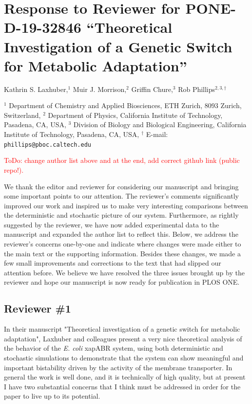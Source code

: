 \documentclass[11pt,letterpaper]{article}
\begin{document}
\section*{Response to Reviewer for PONE-D-19-32846 ``Theoretical Investigation of a Genetic Switch for Metabolic Adaptation''}
Kathrin S. Laxhuber,$^{1}$ Muir J. Morrison,$^{2}$ Griffin Chure,$^{3}$ Rob Phillips$^{2, 3, \dagger}$
\vspace{10pt}

\noindent\tiny{$^1$ Department of Chemistry and Applied Biosciences, ETH Zurich, 8093 Zurich, Switzerland,
$^2$ Department of Physics, California Institute of Technology, Pasadena, CA, USA,
$^3$ Division of Biology and Biological Engineering, California Institute of Technology, Pasadena, CA, USA, $^\dagger$ E-mail: \texttt{phillips@pboc.caltech.edu}}

{\Large\textcolor{red}{ToDo: change author list above and at the end, add correct github link (public repo!).}}

\begin{responseSummary}
We thank the editor and reviewer for considering our manuscript and
bringing some important points to our attention. The reviewer's comments
significantly improved our work and inspired us to make very interesting
comparisons between the deterministic and stochastic picture of our
system. Furthermore, as rightly suggested by the reviewer, we have now
added experimental data to the manuscript and expanded the author list
to reflect this. Below, we address the reviewer's concerns one-by-one
and indicate where changes were made either to the main text or the
supporting information. Besides these changes, we made a few small
improvements and corrections to the text that had slipped our attention before. We
believe we have resolved the three issues brought up by the reviewer and
hope our manuscript is now ready for publication in PLOS ONE.
\end{responseSummary}

\subsection*{Reviewer \#1}
\begin{review}
In their manuscript "Theoretical investigation of a genetic switch for
metabolic adaptation", Laxhuber and colleagues present a very nice
theoretical analysis of the behavior of the \emph{E. coli} xapABR system, using
both deterministic and stochastic simulations to demonstrate that the
system can show meaningful and important bistability driven by the
activity of the membrane transporter. In general the work is well done,
and it is technically of high quality, but at present I have two
substantial concerns that I think must be addressed in order for the
paper to live up to its potential.
\end{review}
\end{document}
